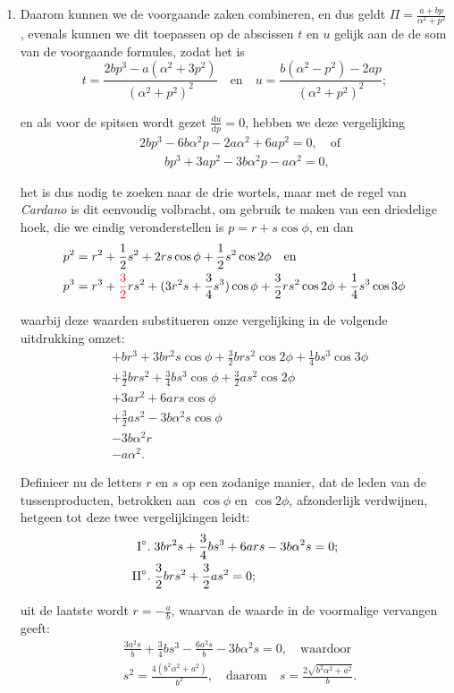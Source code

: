 \documentclass[10pt,a4paper]{article}
\newcommand{\switchenum}{\setcounter{enumi}{\arabic{enumi}-1}\switchcolumn}
\def\D{\mathrm{d}}
\begin{document}
\begin{paracol}{2}
\begin{enumerate}[topsep=1px]
		\switchenum
		\item Daarom kunnen we de voorgaande zaken combineren, en dus geldt $\Pi = \frac{a+bp}{\alpha^2+p^2}$, evenals kunnen we dit toepassen op de abscissen $t$ en $u$ gelijk aan de de som van de voorgaande formules, zodat het is
		\[
			t = \frac{2bp^3 - a(\alpha^2 + 3p^2)}{(\alpha^2 + p^2)^2} \quad \text{en} \quad u = \frac{b(\alpha ^2- p^2)-2ap}{(\alpha^2 + p^2)^2};
		\]
		\par en als voor de spitsen wordt gezet $\frac{\D u}{\D p}=0$, hebben we deze vergelijking
		\begin{align*}
			&2bp^3-6b\alpha^2 p -2a \alpha^2 +6a p^2 = 0, \quad \text{of}\\
			&\qquad bp^3+3ap^2 -3b\alpha^2 p - a\alpha^2 = 0,
		\end{align*}
		\par het is dus nodig te zoeken naar de drie wortels, maar met de regel van \textit{Cardano} is dit eenvoudig volbracht, om gebruik te maken van een driedelige hoek, die we eindig veronderstellen is $p=r+s\cos \phi$, en dan
		\begin{align*}
			p^2 & = r^2 + \frac{1}{2}s^2 +2rs \cos\phi + \frac{1}{2}s^2 \cos 2\phi \quad \text{en}\\
			p^3 & = r^3+{\color{red}\frac{3}{2}}rs^2 + (3r^2s+\frac{3}{4}s^3)\cos \phi + \frac{3}{2} rs^2 \cos 2\phi+\frac{1}{4}s^3\cos 3\phi
		\end{align*}
		\par waarbij deze waarden substitueren onze vergelijking in de volgende uitdrukking omzet:
		\begin{align*}
			&+br^3+3br^2s \cos \phi + \frac{3}{2}brs^2 \cos 2\phi+ \frac{1}{4}bs^3\cos 3\phi\\
			&+\frac{3}{2}brs^2 + \frac{3}{4}bs^3\cos \phi + \frac{3}{2}as^2 \cos 2\phi\\
			&+3ar^2 + 6ars \cos \phi\\
			&+\frac{3}{2}as^2 - 3b\alpha^2 s \cos \phi\\
			&-3b\alpha^2 r\\
			&-a \alpha^2.
		\end{align*}
		\par Definieer nu de letters $r$ en $s$ op een zodanige manier, dat de leden van de tussenproducten, betrokken aan $\cos \phi$ en $\cos 2\phi$, afzonderlijk verdwijnen, hetgeen tot deze twee vergelijkingen leidt:
		\begin{align*}
			\text{I}\degree.\; &3br^2s + \frac{3}{4}bs^3+6ars-3b\alpha^2 s = 0;\\
			\text{II}\degree.\;& \frac{3}{2}brs^2+\frac{3}{2}as^2 = 0;
		\end{align*}
		\par uit de laatste wordt $r=-\frac{a}{b}$, waarvan de waarde in de voormalige vervangen geeft:
		\begin{align*}
			&\frac{3a^2s}{b}+\frac{3}{4}bs^3-\frac{6a^2s}{b}-3b\alpha^2 s = 0, \quad \text{waardoor}\\
			&s^2 = \frac{4(b^2\alpha^2 + a^2)}{b^2}, \quad \text{daarom} \quad s = \frac{2\sqrt{b^2\alpha^2 + a^2}}{b}.
		\end{align*}
		

\end{enumerate}
\end{paracol}
\end{document}
